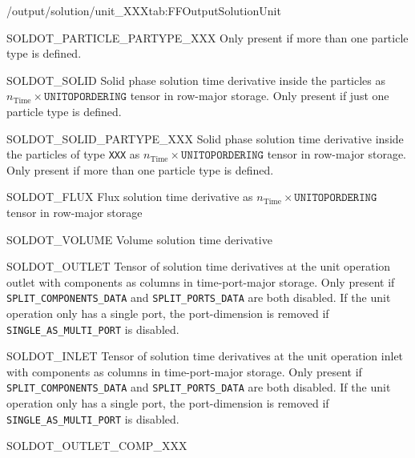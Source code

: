 \begin{groupscope}{/output/solution/unit\_XXX}{tab:FFOutputSolutionUnit}
\begin{dataset}[type=double,unit={\si{\mol\per\cubic\metre\of{MP}\per\second}}]{SOLDOT\_PARTICLE\_PARTYPE\_XXX}
    Only present if more than one particle type is defined.
  \end{dataset}
  \begin{dataset}[type=double,unit={\si{\mol\per\cubic\metre\of{MP}\per\second}}]{SOLDOT\_SOLID}
    Solid phase solution time derivative inside the particles as $n_{\text{Time}} \times \texttt{UNITOPORDERING}$ tensor in row-major storage.
    Only present if just one particle type is defined.
  \end{dataset}
  \begin{dataset}[type=double,unit={\si{\mol\per\cubic\metre\of{SP}\per\second}}]{SOLDOT\_SOLID\_PARTYPE\_XXX}
    Solid phase solution time derivative inside the particles of type \texttt{XXX} as $n_{\text{Time}} \times \texttt{UNITOPORDERING}$ tensor in row-major storage.
    Only present if more than one particle type is defined.
  \end{dataset}
  \begin{dataset}[type=double,unit={\si{\mol\per\square\metre\per\square\second}}]{SOLDOT\_FLUX}
    Flux solution time derivative as $n_{\text{Time}} \times \texttt{UNITOPORDERING}$ tensor in row-major storage
  \end{dataset}
  \begin{dataset}[type=double,unit={\si{\cubic\metre\per\second}}]{SOLDOT\_VOLUME}
    Volume solution time derivative 
  \end{dataset}
  \begin{dataset}[type=double,unit={\si{\mol\per\cubic\metre\of{IV}\per\second}}]{SOLDOT\_OUTLET}
    Tensor of solution time derivatives at the unit operation outlet with components as columns in time-port-major storage.
    Only present if \texttt{SPLIT\_COMPONENTS\_DATA} and \texttt{SPLIT\_PORTS\_DATA} are both disabled.
    If the unit operation only has a single port, the port-dimension is removed if \texttt{SINGLE\_AS\_MULTI\_PORT} is disabled.
  \end{dataset}
  \begin{dataset}[type=double,unit={\si{\mol\per\cubic\metre\of{IV}\per\second}}]{SOLDOT\_INLET}
    Tensor of solution time derivatives at the unit operation inlet with components as columns in time-port-major storage.
    Only present if \texttt{SPLIT\_COMPONENTS\_DATA} and \texttt{SPLIT\_PORTS\_DATA} are both disabled.
    If the unit operation only has a single port, the port-dimension is removed if \texttt{SINGLE\_AS\_MULTI\_PORT} is disabled.
  \end{dataset}
  \begin{dataset}[type=double,unit={\si{\mol\per\cubic\metre\of{IV}\per\second}}]{SOLDOT\_OUTLET\_COMP\_XXX}

\end{dataset}
\end{groupscope}
